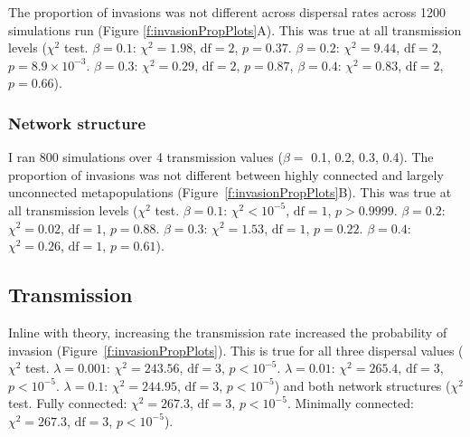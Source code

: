 The proportion of invasions was not different across dispersal rates across 1200 simulations run (Figure \ref{f:invasionPropPlots}A).
This was true at all transmission levels ($\chi^2$ test. $\beta = 0.1$: $\chi^2 = 1.98$, $\text{df} = 2$, $p = 0.37$. $\beta = 0.2$: $\chi^2 = 9.44$, $\text{df} = 2$, $p = \ensuremath{8.9\times 10^{-3}}$. $\beta = 0.3$: $\chi^2 = 0.29$, $\text{df} = 2$, $p = 0.87$, $\beta = 0.4$: $\chi^2 = 0.83$, $\text{df} = 2$, $p = 0.66$).


\subsubsection{Network structure}

I ran 800 simulations over 4 transmission values ($\beta = $ 0.1, 0.2, 0.3, 0.4).
The proportion of invasions was not different between highly connected and largely unconnected metapopulations (Figure~\ref{f:invasionPropPlots}B). 
This was true at all transmission levels ($\chi^2$ test. $\beta = 0.1$: $\chi^2 < 10^{-5}$, $\text{df} = 1$, $p > 0.9999$. $\beta = 0.2$: $\chi^2 = 0.02$, $\text{df} = 1$, $p = 0.88$. $\beta = 0.3$: $\chi^2 = 1.53$, $\text{df} = 1$, $p = 0.22$. $\beta = 0.4$: $\chi^2 = 0.26$, $\text{df} = 1$, $p = 0.61$).

 
\subsection{Transmission}

Inline with theory, increasing the transmission rate increased the probability of invasion (Figure~\ref{f:invasionPropPlots}).
This is true for all three dispersal values ($\chi^2$ test. $\lambda = 0.001$: $\chi^2 = 243.56$, $\text{df} = 3$, $p < 10^{-5}$. $\lambda = 0.01$: $\chi^2 = 265.4$, $\text{df} = 3$, $p < 10^{-5}$. $\lambda = 0.1$: $\chi^2 = 244.95$, $\text{df} = 3$, $p < 10^{-5}$) and both network structures ($\chi^2$ test. Fully connected: $\chi^2 = 267.3$, $\text{df} = 3$, $p < 10^{-5}$. Minimally connected: $\chi^2 =  267.3$, $\text{df} = 3$, $p < 10^{-5}$).









